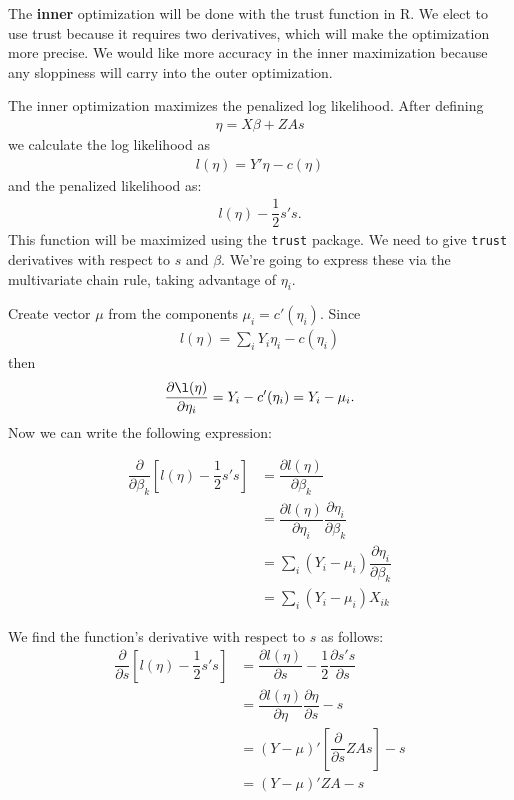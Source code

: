 \documentclass{article}
\begin{document}
The {\bf inner} optimization will be done with the trust function in R. We elect to use trust because it requires two derivatives, which will make the optimization more precise. We would like more accuracy in the inner maximization because any sloppiness will carry into the outer optimization.

The inner optimization maximizes the penalized log likelihood. After defining
\begin{align}
\eta=X\beta +ZAs
\end{align}
we calculate the  log likelihood as 
\begin{align}
l(\eta)= Y' \eta - c(\eta) 
\end{align}
and the penalized likelihood as:
\begin{align}
 l(\eta)- \dfrac{1}{2} s's.
\end{align}
This function will be maximized using the \texttt{trust} package. We need to give \texttt{trust} derivatives with respect to $s$ and $\beta$. We're going to express these via the multivariate chain rule, taking advantage of $\eta_i$.

Create  vector $\mu$ from the components $\mu_i=c'(\eta_i)$.  Since
\begin{align}
l(\eta) = \sum_i Y_i \eta_i - c(\eta_i)
\end{align}
then 
\begin{align}
\dfrac{\partial \l(\eta)}{\partial \eta_i} = Y_i-c'(\eta_i) = Y_i -\mu_i.
\end{align}
 Now we can write the following expression:

\begin{align}
\dfrac{\partial}{\partial \beta_k} \left[ l(\eta)-\dfrac{1}{2} s's  \right] &= \dfrac{\partial l(\eta)}{\partial \beta_k}    \\
&= \dfrac{\partial l(\eta)}{\partial \eta_i} \dfrac{\partial \eta_i}{\partial \beta_k}    \\
&=\sum_i (Y_i-\mu_i) \dfrac{\partial \eta_i}{\partial \beta_k} \\
&=\sum_i (Y_i-\mu_i) X_{ik}
\end{align}


We find the function's derivative with respect to $s$ as follows:
\begin{align}
\dfrac{\partial }{\partial s} \left[ l(\eta) -\dfrac{1}{2} s's   \right] &= \dfrac{\partial l(\eta)}{\partial s} -\dfrac{1}{2} \dfrac{\partial s's}{\partial s}\\
&= \dfrac{\partial l(\eta)}{\partial \eta} \dfrac{\partial \eta}{\partial s} -s\\
&= (Y-\mu)' \left[ \dfrac{\partial}{\partial s} ZAs \right] -s\\
&=(Y-\mu)'ZA -s
\end{align}
\end{document}
